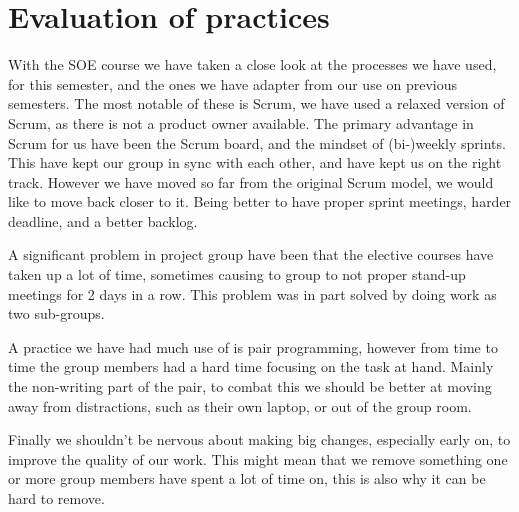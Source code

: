\chapter{Evaluation of practices}
With the SOE course we have taken a close look at the processes we have used, for this semester, and the ones we have adapter from our use on previous semesters.
The most notable of these is Scrum, we have used a relaxed version of Scrum, as there is not a product owner available. 
The primary advantage in Scrum for us have been the Scrum board, and the mindset of (bi-)weekly sprints.
This have kept our group in sync with each other, and have kept us on the right track. 
However we have moved so far from the original Scrum model, we would like to move back closer to it.
Being better to have proper sprint meetings, harder deadline, and a better backlog. 

A significant problem in project group have been that the elective courses have taken up a lot of time, sometimes causing to group to not proper stand-up meetings for 2 days in a row. 
This problem was in part solved by doing work as two sub-groups. 

A practice we have had much use of is pair programming, however from time to time the group members had a hard time focusing on the task at hand. 
Mainly the non-writing part of the pair, to combat this we should be better at moving away from distractions, such as their own laptop, or out of the group room. 

Finally we shouldn't be nervous about making big changes, especially early on, to improve the quality of our work. 
This might mean that we remove something one or more group members have spent a lot of time on, this is also why it can be hard to remove. 
